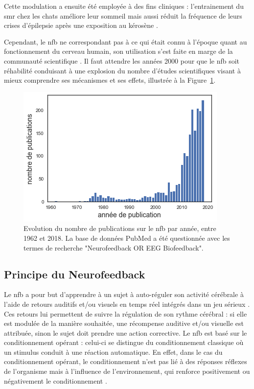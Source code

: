 Cette modulation a ensuite été employée à des fins cliniques : l'entrainement du \gls{smr} chez les chats améliore leur sommeil \citep{Sterman1970} mais aussi
réduit la fréquence de leurs crises d'épilepsie après une exposition au kérosène \citep{Sterman1974}. 

Cependant, le \gls{nfb} ne correspondant pas à ce qui 
était connu à l'époque quant au fonctionnement du cerveau humain, son utilisation s'est faite en marge de la communauté scientifique \citep{Masterpasqua2003}. 
Il faut attendre les années 2000 pour que le \gls{nfb} soit réhabilité conduisant à une explosion du nombre d'études scientifiques visant à mieux comprendre 
ses mécanismes et ses effets, illustrée à la Figure~\ref{Figure:introduction_number_of_nfb_publications}. 

\begin{figure}[h!]
  \centering
	\includegraphics[width=0.7\linewidth]{figures/chapter-1/introduction-number-of-nfb-publications} 
  \caption{Evolution du nombre de publications sur le \gls{nfb} par année, entre 1962 et 2018. La base de données PubMed a été questionnée avec les 
	termes de recherche "Neurofeedback OR EEG Biofeedback".}
  \label{Figure:introduction_number_of_nfb_publications}
\end{figure}

\subsection{Principe du Neurofeedback} \label{principe_nfb}

Le \gls{nfb} a pour but d'apprendre à un sujet à auto-réguler son activité cérébrale à l'aide de retours auditifs et/ou visuels en temps réel
intégrés dans un jeu sérieux \citep{Wang2010}. Ces retours lui permettent de suivre la régulation de son rythme cérébral : si elle est modulée de 
la manière souhaitée, une récompense auditive et/ou visuelle est attribuée, sinon le sujet doit prendre une action corrective. Le \gls{nfb} 
est basé sur le conditionnement opérant \citep{Reynolds1975} : celui-ci se distingue du conditionnement classique où un stimulus conduit à 
une réaction automatique. En effet, dans le cas du conditionnement opérant, le conditionnement n'est pas lié à des réponses réflexes de
l'organisme mais à l'influence de l'environnement, qui renforce positivement ou négativement le conditionnement \citep{Skinner1948}. 

